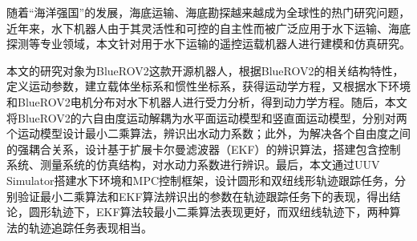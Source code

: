 \begin{abstractzh}

随着“海洋强国”的发展，海底运输、海底勘探越来越成为全球性的热门研究问题，近年来，水下机器人由于其灵活性和可控的自主性而被广泛应用于水下运输、海底探测等专业领域，本文针对用于水下运输的遥控运载机器人进行建模和仿真研究。

本文的研究对象为BlueROV2这款开源机器人，根据BlueROV2的相关结构特性，定义运动参数，建立载体坐标系和惯性坐标系，获得运动学方程，又根据水下环境和BlueROV2电机分布对水下机器人进行受力分析，得到动力学方程。随后，本文将BlueROV2的六自由度运动解耦为水平面运动模型和竖直面运动模型，分别对两个运动模型设计最小二乘算法，辨识出水动力系数；此外，为解决各个自由度之间的强耦合关系，设计基于扩展卡尔曼滤波器（EKF）的辨识算法，搭建包含控制系统、测量系统的仿真结构，对水动力系数进行辨识。最后，本文通过UUV Simulator搭建水下环境和MPC控制框架，设计圆形和双纽线形轨迹跟踪任务，分别验证最小二乘算法和EKF算法辨识出的参数在轨迹跟踪任务下的表现，得出结论，圆形轨迹下，EKF算法较最小二乘算法表现更好，而双纽线轨迹下，两种算法的轨迹追踪任务表现相当。


\end{abstractzh}
